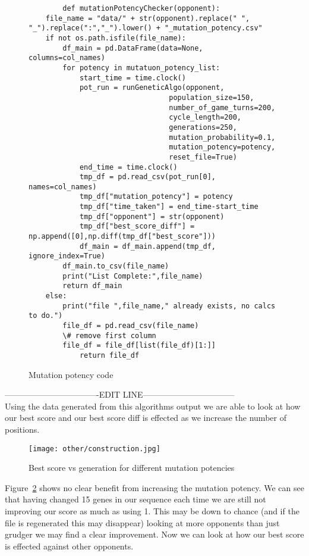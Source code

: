 \begin{figure}
    \begin{verbatim}
        def mutationPotencyChecker(opponent):
    file_name = "data/" + str(opponent).replace(" ", "_").replace(":","_").lower() + "_mutation_potency.csv"
    if not os.path.isfile(file_name):
        df_main = pd.DataFrame(data=None, columns=col_names)
        for potency in mutatuon_potency_list:
            start_time = time.clock()
            pot_run = runGeneticAlgo(opponent,
                                 population_size=150,
                                 number_of_game_turns=200,
                                 cycle_length=200, 
                                 generations=250,
                                 mutation_probability=0.1,
                                 mutation_potency=potency,
                                 reset_file=True)
            end_time = time.clock()
            tmp_df = pd.read_csv(pot_run[0], names=col_names)
            tmp_df["mutation_potency"] = potency
            tmp_df["time_taken"] = end_time-start_time
            tmp_df["opponent"] = str(opponent)
            tmp_df["best_score_diff"] = np.append([0],np.diff(tmp_df["best_score"]))
            df_main = df_main.append(tmp_df, ignore_index=True)
        df_main.to_csv(file_name)
        print("List Complete:",file_name)
        return df_main
    else:
        print("file ",file_name," already exists, no calcs to do.")
        file_df = pd.read_csv(file_name) 
        \# remove first column
        file_df = file_df[list(file_df)[1:]]
            return file_df
    \end{verbatim}
    \caption{Mutation potency code}\label{code:mutationChecker}    
\end{figure}
----------------------------------EDIT LINE---------------------------------\\

Using the data generated from this algorithms output we are able to look at how our best score and our best score diff is effected as we increase the number of positions.

\begin{figure}
    \texttt{[image: other/construction.jpg]}
    \caption{Best score vs generation for different mutation potencies}\label{fig:MUT-POT-bs-v-gen-all}
\end{figure}

Figure~\ref{fig:MUT-POT-bs-v-gen-all} shows no clear benefit from increasing the mutation potency. We can see that having changed 15 genes in our sequence each time we are still not improving our score as much as using 1. This may be down to chance (and if the file is regenerated this may disappear) looking at more opponents than just grudger we may find a clear improvement.
Now we can look at how our best score is effected against other opponents.\\
        
